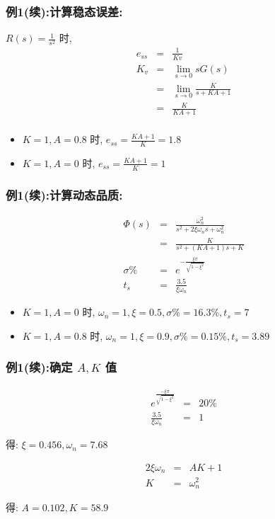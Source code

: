 \documentclass{article}
\begin{document}
\begin{frame}
\frametitle{例1(续):计算稳态误差:}
\label{sec-4-1-2}

 $R(s)=\frac{1}{s^2}$ 时,
\begin{eqnarray*}
e_{ss} &=& \frac{1}{Kv} \\
K_v &=& \lim_{s\rightarrow 0}sG(s) \\
    &=& \lim_{s\rightarrow 0}\frac{K}{s+KA+1} \\
    &=& \frac{K}{KA+1} \\
\end{eqnarray*}

\begin{itemize}
\item $K=1,A=0.8$ 时, $e_{ss}=\frac{KA+1}{K}=1.8$
\item $K=1,A=0$ 时, $e_{ss}=\frac{KA+1}{K}=1$
\end{itemize}
\end{frame}
\begin{frame}
\frametitle{例1(续):计算动态品质:}
\label{sec-4-1-3}


\begin{eqnarray*}
\Phi(s) &=& \frac{\omega_n^2}{s^2+2\xi\omega_n s+\omega_n^2} \\
        &=& \frac{K}{s^2+(KA+1)s+K} \\
\sigma\% &=& e^{-\frac{\xi\pi}{\sqrt{1-\xi^2}}} \\
t_s &=& \frac{3.5}{\xi\omega_n}
\end{eqnarray*}

\begin{itemize}
\item <2-> $K=1,A=0$ 时, $\omega_n=1,\xi=0.5,\sigma\%=16.3\%,t_s=7$
\item <3-> $K=1,A=0.8$ 时, $\omega_n=1,\xi=0.9,\sigma\%=0.15\%,t_s=3.89$
\end{itemize}
\end{frame}
\begin{frame}
\frametitle{例1(续):确定 $A,K$ 值}
\label{sec-4-1-4}



\begin{eqnarray*}
e^{\frac{-\xi\pi}{\sqrt{1-\xi^2}}} &=&20\% \\
\frac{3.5}{\xi\omega_n} &=& 1
\end{eqnarray*}

得: $\xi=0.456,\omega_n=7.68$

\begin{eqnarray*}
2\xi\omega_n & = & AK+1\\
K &=& \omega_n^2
\end{eqnarray*}

得: $A=0.102,K=58.9$
\end{frame}
\end{document}
